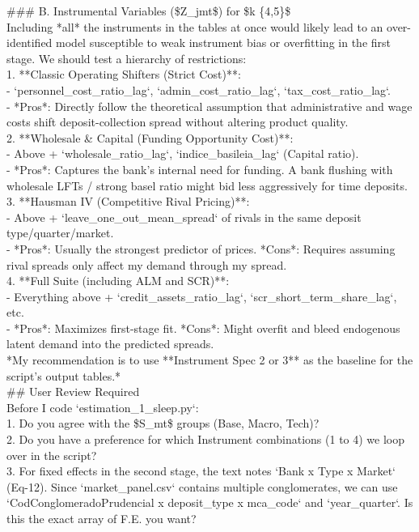 \documentclass{article}
\begin{document}
\#\#\# B. Instrumental Variables (\$Z\_{jmt}\$) for \$k \in \{4,5\}\$ \\



Including *all* the instruments in the tables at once would likely lead to an over-identified model susceptible to weak instrument bias or overfitting in the first stage. We should test a hierarchy of restrictions: \\



1. **Classic Operating Shifters (Strict Cost)**: \\
   - `personnel\_cost\_ratio\_lag`, `admin\_cost\_ratio\_lag`, `tax\_cost\_ratio\_lag`. \\
   - *Pros*: Directly follow the theoretical assumption that administrative and wage costs shift deposit-collection spread without altering product quality. \\
2. **Wholesale \& Capital (Funding Opportunity Cost)**: \\
   - Above + `wholesale\_ratio\_lag`, `indice\_basileia\_lag` (Capital ratio). \\
   - *Pros*: Captures the bank's internal need for funding. A bank flushing with wholesale LFTs / strong basel ratio might bid less aggressively for time deposits. \\
3. **Hausman IV (Competitive Rival Pricing)**: \\
   - Above + `leave\_one\_out\_mean\_spread` of rivals in the same deposit type/quarter/market. \\
   - *Pros*: Usually the strongest predictor of prices. *Cons*: Requires assuming rival spreads only affect my demand through my spread. \\
4. **Full Suite (including ALM and SCR)**: \\
   - Everything above + `credit\_assets\_ratio\_lag`, `scr\_short\_term\_share\_lag`, etc. \\
   - *Pros*: Maximizes first-stage fit. *Cons*: Might overfit and bleed endogenous latent demand into the predicted spreads. \\



*My recommendation is to use **Instrument Spec 2 or 3** as the baseline for the script's output tables.* \\



\#\# User Review Required \\
Before I code `estimation\_1\_sleep.py`: \\
1. Do you agree with the \$S\_{mt}\$ groups (Base, Macro, Tech)? \\
2. Do you have a preference for which Instrument combinations (1 to 4) we loop over in the script? \\
3. For fixed effects in the second stage, the text notes `Bank x Type x Market` (Eq-12). Since `market\_panel.csv` contains multiple conglomerates, we can use `CodConglomeradoPrudencial x deposit\_type x mca\_code` and `year\_quarter`. Is this the exact array of F.E. you want? \\
\end{document}
